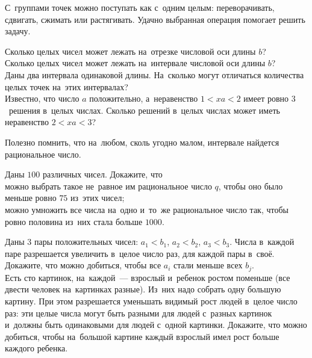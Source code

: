 С~группами точек можно поступать как с~одним целым: переворачивать, сдвигать,
сжимать или растягивать.
Удачно выбранная операция помогает решить задачу.

\begin{exercises}

\item
\subproblem
Сколько целых чисел может лежать на~отрезке числовой оси длины $b$?
\\
\subproblem
Сколько целых чисел может лежать на~интервале числовой оси длины $b$?
\\
\subproblem
Даны два интервала одинаковой длины.
На~сколько могут отличаться количества целых точек на~этих интервалах?
\\
\subproblem
Известно, что число $a$ положительно, а~неравенство $1 < x a < 2$
имеет ровно $3$~решения в~целых числах.
Сколько решений в~целых числах может иметь неравенство $2 < x a < 3$?

\end{exercises}

Полезно помнить, что на~любом, сколь угодно малом, интервале найдется
рациональное число.

\begin{exercises}

\item
Даны $100$ различных чисел.
Докажите, что
\\
\subproblem
можно выбрать такое не~равное им рациональное число $q$, чтобы оно было меньше
ровно $75$ из~этих чисел;
\\
\subproblem
можно умножить все числа на~одно и~то~же рациональное число так,
чтобы ровно половина из~них стала больше $1000$.

\item
\subproblem
Даны $3$ пары положительных чисел:
$a_{1} < b_{1}$, $a_{2} < b_{2}$, $a_{3} < b_{3}$.
Числа в~каждой паре разрешается увеличить в~целое число раз, для каждой пары
в~своё.
Докажите, что можно добиться, чтобы все $a_{i}$ стали меньше всех $b_{j}$.
\\
\subproblem
Есть сто картинок, на~каждой~--- взрослый и~ребенок ростом поменьше
(все двести человек на~картинках разные).
Из~них надо собрать одну большую картину.
При этом разрешается уменьшать видимый рост людей в~целое число раз: эти целые
числа могут быть разными для людей с~разных картинок и~должны быть одинаковыми
для людей с~одной картинки.
Докажите, что можно добиться, чтобы на~большой картине каждый взрослый имел
рост больше каждого ребенка.

\end{exercises}

